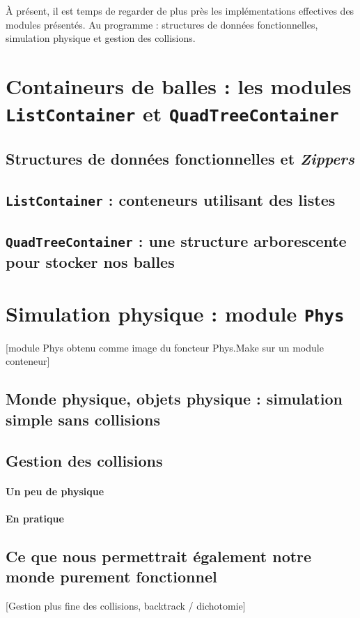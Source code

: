 \documentclass[a4paper]{scrartcl}
\begin{document}
\section*{}
À présent, il est temps de regarder de plus près les implémentations
effectives des modules présentés. Au programme : structures de données
fonctionnelles, simulation physique et gestion des collisions.

\section{Containeurs de balles : les modules \texttt{ListContainer}
  et \texttt{QuadTreeContainer}}
\subsection{Structures de données fonctionnelles et \emph{Zippers}}
\subsection{\texttt{ListContainer} : conteneurs utilisant des listes}
\subsection{\texttt{QuadTreeContainer} : une structure arborescente
  pour stocker nos balles}

\section{Simulation physique : module \texttt{Phys}}
[module Phys obtenu comme image du foncteur Phys.Make sur un module
conteneur]
\subsection{Monde physique, objets physique : simulation simple sans
  collisions}
\subsection{Gestion des collisions}
\paragraph{Un peu de physique}
\paragraph{En pratique}
\subsection{Ce que nous permettrait également notre monde purement
  fonctionnel}
[Gestion plus fine des collisions, backtrack / dichotomie]
\end{document}
